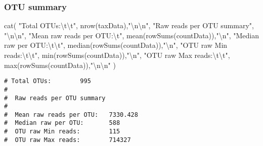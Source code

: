 \documentclass[
]{article}
\newenvironment{Shaded}{\begin{snugshade}}{\end{snugshade}}
\newcommand{\FunctionTok}[1]{\textcolor[rgb]{0.00,0.00,0.00}{#1}}
\newcommand{\NormalTok}[1]{#1}
\newcommand{\SpecialCharTok}[1]{\textcolor[rgb]{0.00,0.00,0.00}{#1}}
\newcommand{\StringTok}[1]{\textcolor[rgb]{0.31,0.60,0.02}{#1}}
\begin{document}
\hypertarget{otu-summary}{%
\subsubsection{OTU summary}\label{otu-summary}}

\begin{Shaded}
\begin{Highlighting}[]
\FunctionTok{cat}\NormalTok{(}
  \StringTok{"Total OTUs:}\SpecialCharTok{\textbackslash{}t\textbackslash{}t}\StringTok{"}\NormalTok{, }\FunctionTok{nrow}\NormalTok{(taxData),}\StringTok{"}\SpecialCharTok{\textbackslash{}n\textbackslash{}n}\StringTok{"}\NormalTok{,}
  \StringTok{"Raw reads per OTU summary"}\NormalTok{, }\StringTok{"}\SpecialCharTok{\textbackslash{}n\textbackslash{}n}\StringTok{"}\NormalTok{,}
  \StringTok{"Mean raw reads per OTU:}\SpecialCharTok{\textbackslash{}t}\StringTok{"}\NormalTok{, }\FunctionTok{mean}\NormalTok{(}\FunctionTok{rowSums}\NormalTok{(countData)),}\StringTok{"}\SpecialCharTok{\textbackslash{}n}\StringTok{"}\NormalTok{,}
  \StringTok{"Median raw per OTU:}\SpecialCharTok{\textbackslash{}t\textbackslash{}t}\StringTok{"}\NormalTok{, }\FunctionTok{median}\NormalTok{(}\FunctionTok{rowSums}\NormalTok{(countData)),}\StringTok{"}\SpecialCharTok{\textbackslash{}n}\StringTok{"}\NormalTok{,}
  \StringTok{"OTU raw Min reads:}\SpecialCharTok{\textbackslash{}t\textbackslash{}t}\StringTok{"}\NormalTok{, }\FunctionTok{min}\NormalTok{(}\FunctionTok{rowSums}\NormalTok{(countData)),}\StringTok{"}\SpecialCharTok{\textbackslash{}n}\StringTok{"}\NormalTok{,}
  \StringTok{"OTU raw Max reads:}\SpecialCharTok{\textbackslash{}t\textbackslash{}t}\StringTok{"}\NormalTok{, }\FunctionTok{max}\NormalTok{(}\FunctionTok{rowSums}\NormalTok{(countData)),}\StringTok{"}\SpecialCharTok{\textbackslash{}n\textbackslash{}n}\StringTok{"}
\NormalTok{)}
\end{Highlighting}
\end{Shaded}

\begin{verbatim}
# Total OTUs:        995 
# 
#  Raw reads per OTU summary 
# 
#  Mean raw reads per OTU:   7330.428 
#  Median raw per OTU:       588 
#  OTU raw Min reads:        115 
#  OTU raw Max reads:        714327
\end{verbatim}
\end{document}

